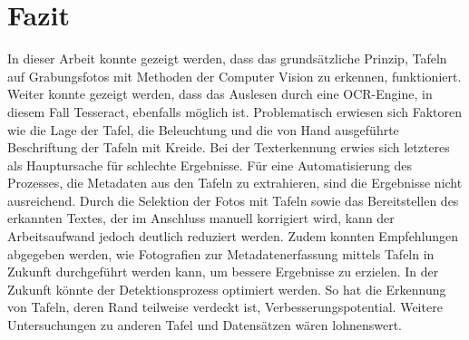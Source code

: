 \section{Fazit}

In dieser Arbeit konnte gezeigt werden, dass das grundsätzliche Prinzip, Tafeln auf Grabungsfotos mit Methoden der Computer Vision zu erkennen, funktioniert. Weiter konnte gezeigt werden, dass das Auslesen durch eine OCR-Engine, in diesem Fall Tesseract, ebenfalls möglich ist. Problematisch erwiesen sich Faktoren wie die Lage der Tafel, die Beleuchtung und die von Hand ausgeführte Beschriftung der Tafeln mit Kreide. Bei der Texterkennung erwies sich letzteres als Hauptursache für schlechte Ergebnisse.
Für eine Automatisierung des Prozesses, die Metadaten aus den Tafeln zu extrahieren, sind die Ergebnisse nicht ausreichend. Durch die Selektion der Fotos mit Tafeln sowie das Bereitstellen des erkannten Textes, der im Anschluss manuell korrigiert wird, kann der Arbeitsaufwand jedoch deutlich reduziert werden. Zudem konnten Empfehlungen abgegeben werden, wie Fotografien zur Metadatenerfassung mittels Tafeln in Zukunft durchgeführt werden kann, um bessere Ergebnisse zu erzielen.
In der Zukunft könnte der Detektionsprozess optimiert werden. So hat die Erkennung von Tafeln, deren Rand teilweise verdeckt ist, Verbesserungspotential. Weitere Untersuchungen zu anderen Tafel und Datensätzen wären lohnenswert.